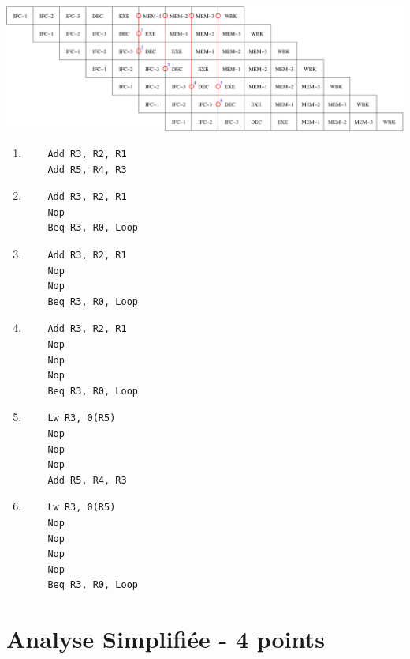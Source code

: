 {\begin{correction}

  \begin{center}
    \includegraphics[scale=0.6]{figures/correction-bypasses.pdf}
  \end{center}

  \begin{enumerate}
    \item
      \begin{verbatim}
	Add R3, R2, R1
	Add R5, R4, R3
      \end{verbatim}
    \item
      \begin{verbatim}
	Add R3, R2, R1
	Nop
	Beq R3, R0, Loop
      \end{verbatim}
    \item
      \begin{verbatim}
	Add R3, R2, R1
	Nop
	Nop
	Beq R3, R0, Loop
      \end{verbatim}
    \item
      \begin{verbatim}
	Add R3, R2, R1
	Nop
	Nop
	Nop
	Beq R3, R0, Loop
      \end{verbatim}
    \item
      \begin{verbatim}
	Lw R3, 0(R5)
	Nop
	Nop
	Nop
	Add R5, R4, R3
      \end{verbatim}
    \item
      \begin{verbatim}
	Lw R3, 0(R5)
	Nop
	Nop
	Nop
	Nop
	Beq R3, R0, Loop
      \end{verbatim}
  \end{enumerate}

\end{correction}

%
%

\section{Analyse Simplifi\'ee - 4 points}

}
